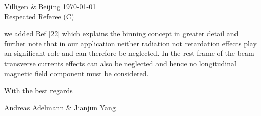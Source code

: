 \documentclass{article}
\begin{document}
Villigen \& Beijing \today \\

Respected Referee (C)

we added Ref [22] which explains the binning concept in greater detail and further note that in our application
neither radiation not retardation effects play an significant role and can therefore be neglected. In the rest frame of the beam transverse currents effects can also be neglected and hence no longitudinal 
magnetic field component must be considered.

With the best regards

Andreas Adelmann \& Jianjun Yang


 
 
\end{document}
